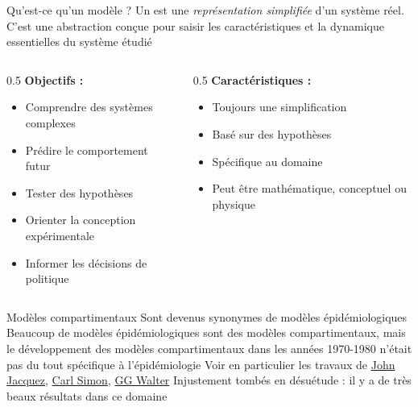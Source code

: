 \documentclass[aspectratio=169]{beamer}\usepackage[]{graphicx}\usepackage[]{xcolor}
\begin{document}
\begin{frame}{Qu'est-ce qu'un modèle ?}
\bbullet
Un  est une \emph{représentation simplifiée} d'un système réel. C'est une abstraction conçue pour saisir les caractéristiques et la dynamique essentielles du système étudié
\vfill
\begin{columns}[t]
  \begin{column}{0.5\textwidth}
    	\textbf{Objectifs :}
    \begin{itemize}
      \item Comprendre des systèmes complexes
      \item Prédire le comportement futur
      \item Tester des hypothèses
      \item Orienter la conception expérimentale
      \item Informer les décisions de politique
    \end{itemize}
  \end{column} 
  \begin{column}{0.5\textwidth}
    	\textbf{Caractéristiques :}
    \begin{itemize}
      \item Toujours une simplification
      \item Basé sur des hypothèses
      \item Spécifique au domaine
      \item Peut être mathématique, conceptuel ou physique
    \end{itemize}
  \end{column}
\end{columns}
\end{frame}


\begin{frame}{Modèles compartimentaux}
\bbullet Sont devenus synonymes de modèles épidémiologiques
\vfill
\bbullet Beaucoup de modèles épidémiologiques sont des modèles compartimentaux, mais le développement des modèles compartimentaux dans les années 1970-1980 n'était pas du tout spécifique à l'épidémiologie
\vfill
\bbullet Voir en particulier les travaux de \href{https://www.semanticscholar.org/author/J.-Jacquez/2321059}{John Jacquez}, \href{https://scholar.google.ca/citations?user=dv_z_mAAAAAJ}{Carl Simon}, \href{https://www.semanticscholar.org/author/G.-Walter/1799059}{GG Walter} \nocite{JacquezSimon1993}
\vfill
\bbullet Injustement tombés en désuétude : il y a de très beaux résultats dans ce domaine    
\end{frame}
\end{document}
